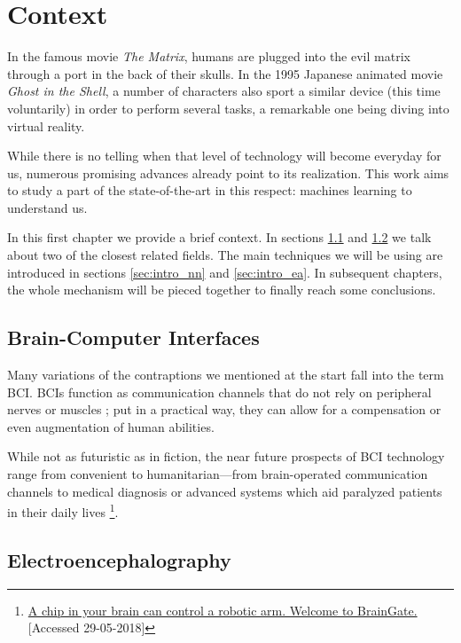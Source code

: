 \chapter{Context}\label{ch:context}

In the famous movie \textit{The Matrix}, humans are plugged into the evil matrix through a port in the back of their skulls. In the 1995 Japanese animated movie \textit{Ghost in the Shell}, a number of characters also sport a similar device (this time voluntarily) in order to perform several tasks, a remarkable one being diving into virtual reality.

While there is no telling when that level of technology will become everyday for us, numerous promising advances already point to its realization. This work aims to study a part of the state-of-the-art in this respect: machines learning to understand us.

In this first chapter we provide a brief context. In sections \ref{sec:intro_bci} and \ref{sec:intro_eeg} we talk about two of the closest related fields. The main techniques we will be using are introduced in sections \ref{sec:intro_nn} and \ref{sec:intro_ea}. In subsequent chapters, the whole mechanism will be pieced together to finally reach some conclusions.

\section{Brain-Computer Interfaces}\label{sec:intro_bci}

	Many variations of the contraptions we mentioned at the start fall into the term \ac{BCI}. \acs{BCI}s function as communication channels that do not rely on peripheral nerves or muscles \cite{bcidef}; put in a practical way, they can allow for a compensation or even augmentation of human abilities.

	While not as futuristic as in fiction, the near future prospects of \acs{BCI} technology range from convenient to humanitarian---from brain-operated communication channels \cite{guger2009many} to medical diagnosis or advanced systems which aid paralyzed patients in their daily lives \footnote{\href{http://www.wired.co.uk/article/braingate}{A chip in your brain can control a robotic arm. Welcome to BrainGate.} [Accessed 29-05-2018]}.

\section{Electroencephalography}\label{sec:intro_eeg}

